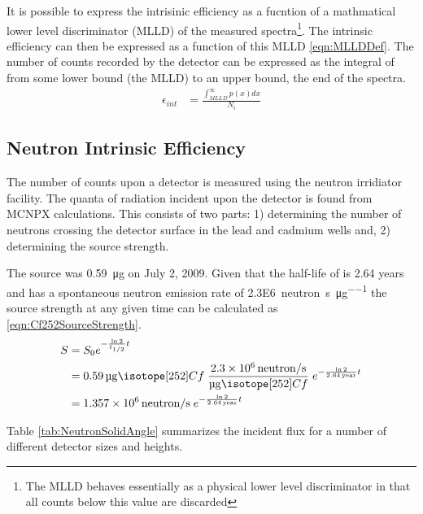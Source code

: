 \documentclass[draftcls,onecolumn]{IEEEtran}
\begin{document}
It is possible to express the intrisinic efficiency as a fucntion of a mathmatical lower level discriminator (MLLD) of the measured spectra\footnote{The MLLD behaves essentially as a physical lower level discriminator in that all counts below this value are discarded}.
The intrinsic efficiency can then be expressed as a function of this MLLD \eqref{eqn:MLLDDef}.
The number of counts recorded by the detector can be expressed as the integral of  from some lower bound (the MLLD) to an upper bound, the end of the spectra.
\begin{align}
	\label{eqn:MLLDDef}
	\epsilon_{int} &= \frac{\int_{MLLD}^\infty p(x)dx}{N_i}
\end{align}


\subsection{Neutron Intrinsic Efficiency}
The number of counts upon a detector is measured using the neutron irridiator facility.
The quanta of radiation incident upon the detector is found from MCNPX calculations.
This consists of two parts: 1) determining the number of neutrons crossing the detector surface in the lead and cadmium wells and, 2) determining the source strength.

The  source was \SI{0.59}{\ug} on July 2, 2009.
Given that the half-life of  is 2.64 years and  has a spontaneous neutron emission rate of \SI{2.3E6}{neutron\per\second\per\micro\gram} the source strength at any given time can be calculated as \eqref{eqn:Cf252SourceStrength}.
\begin{align}
  \label{eqn:Cf252SourceStrength}
  S &= S_0 e^{-\frac{\ln{2}}{t_{1/2}} t} \\ \notag 
    &= \SI{0.59}{\ug} \iso[252]{Cf} \;\frac{\SI{2.3E6}{neutron\per\second}}{\si{\ug} \iso[252]{Cf}}\; e^{-\frac{ \ln{2}}{\SI{2.64}{year}}t}  \\ \notag
    &= \SI{1.357E6}{neutron\per\second}\; e^{-\frac{ \ln{2}}{\SI{2.64}{year}}t} 
\end{align}

Table \ref{tab:NeutronSolidAngle} summarizes the incident flux for a number of different detector sizes and heights.
\end{document}
